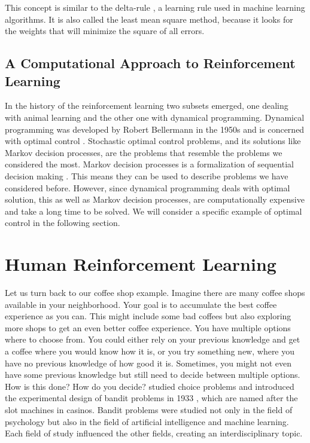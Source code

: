 This concept is similar to the delta-rule \citep{widrow1960adaptive}, a learning rule used in machine learning algorithms. It is also called the least mean square method, because it looks for the weights that will minimize the square of all errors.


\subsection{A Computational Approach to Reinforcement Learning}
In the history of the reinforcement learning two subsets emerged, one dealing with animal learning and the other one with dynamical programming. Dynamical programming \citep{bellman1960dynamic} was developed by Robert Bellermann in the 1950s and is concerned with optimal control \citep{sutton2018reinforcement}. 
Stochastic optimal control problems, and its solutions like Markov decision processes, are the problems that resemble the problems we considered the most. Markov decision processes is a formalization of sequential decision making \citep{sutton2018reinforcement}. This means they can be used to describe problems we have considered before.  
However, since dynamical programming deals with optimal solution, this as well as Markov decision processes, are computationally expensive and take a long time to be solved. We will consider a specific example of optimal control in the following section. 

\section{Human Reinforcement Learning}
Let us turn back to our coffee shop example. Imagine there are many coffee shops available in your neighborhood. Your goal is to accumulate the best coffee experience as you can. This might include some bad coffees but also exploring more shops to get an even better coffee experience. 
You have multiple options where to choose from. You could either rely on your previous knowledge and get a coffee where you would know how it is, or you try something new, where you have no previous knowledge of how good it is. Sometimes, you might not even have some previous knowledge but still need to decide between multiple options. How is this done? How do you decide? 
\citeauthor{thompson1933likelihood} studied choice problems and introduced the experimental design of bandit problems in 1933 \citep{thompson1933likelihood}, which are named after the slot machines in casinos. Bandit problems were studied not only in the field of psychology but also in the field of artificial intelligence and machine learning. Each field of study influenced the other fields, creating an interdisciplinary topic.   

